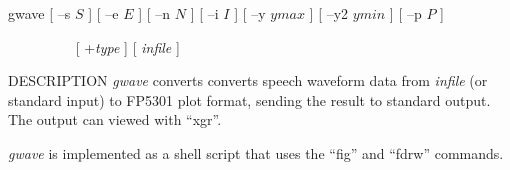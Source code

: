 % 
% 
% 
% 
%                                                                        
%
\hypertarget{gwave}{}

\begin{synopsis}
\item[gwave] [ --s $S$ ] [ --e $E$ ] [ --n $N$ ] [ --i $I$ ] [ --y $ymax$ ]
	       [ --y2 $ymin$ ] [ --p $P$ ] 
\item[\ ~~~~~~~~] [ +{\em type} ]  [ {\em infile} ]

\end{synopsis}

\begin{qsection}{DESCRIPTION}
{\em gwave} converts converts speech waveform data 
from {\em infile} (or standard input) to FP5301 plot format, 
sending the result to standard output. 
The output can viewed with ``xgr''.

{\em gwave} is implemented as a shell script 
that uses the ``fig'' and ``fdrw'' commands.
\end{qsection}

